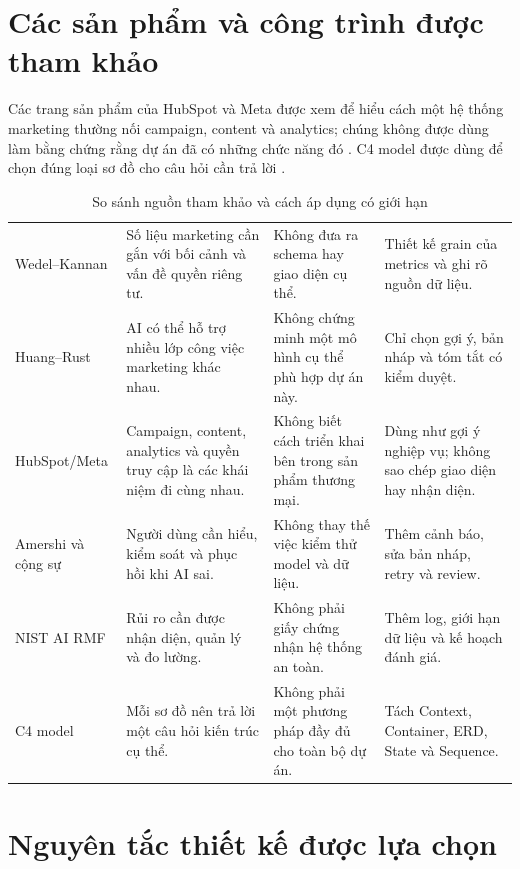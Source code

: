 \section{Các sản phẩm và công trình được tham khảo}

Các trang sản phẩm của HubSpot và Meta được xem để hiểu cách một hệ thống marketing thường nối campaign, content và analytics; chúng không được dùng làm bằng chứng rằng dự án đã có những chức năng đó \cite{hubspot,meta-insights}. C4 model được dùng để chọn đúng loại sơ đồ cho câu hỏi cần trả lời \cite{c4}.

\begin{table}[h!]
\centering
\small
\caption{So sánh nguồn tham khảo và cách áp dụng có giới hạn}
\label{tab:v8-related-work}
\begin{tabularx}{\textwidth}{|L{2.6cm}|L{3.8cm}|L{3.6cm}|Y|}
\hline
{} &  &  & \\
\hline
Wedel--Kannan & Số liệu marketing cần gắn với bối cảnh và vấn đề quyền riêng tư. & Không đưa ra schema hay giao diện cụ thể. & Thiết kế grain của metrics và ghi rõ nguồn dữ liệu.\\
\hline
Huang--Rust & AI có thể hỗ trợ nhiều lớp công việc marketing khác nhau. & Không chứng minh một mô hình cụ thể phù hợp dự án này. & Chỉ chọn gợi ý, bản nháp và tóm tắt có kiểm duyệt.\\
\hline
HubSpot/Meta & Campaign, content, analytics và quyền truy cập là các khái niệm đi cùng nhau. & Không biết cách triển khai bên trong sản phẩm thương mại. & Dùng như gợi ý nghiệp vụ; không sao chép giao diện hay nhận diện.\\
\hline
Amershi và cộng sự & Người dùng cần hiểu, kiểm soát và phục hồi khi AI sai. & Không thay thế việc kiểm thử model và dữ liệu. & Thêm cảnh báo, sửa bản nháp, retry và review.\\
\hline
NIST AI RMF & Rủi ro cần được nhận diện, quản lý và đo lường. & Không phải giấy chứng nhận hệ thống an toàn. & Thêm log, giới hạn dữ liệu và kế hoạch đánh giá.\\
\hline
C4 model & Mỗi sơ đồ nên trả lời một câu hỏi kiến trúc cụ thể. & Không phải một phương pháp đầy đủ cho toàn bộ dự án. & Tách Context, Container, ERD, State và Sequence.\\
\hline
\end{tabularx}
\end{table}

\section{Nguyên tắc thiết kế được lựa chọn}

